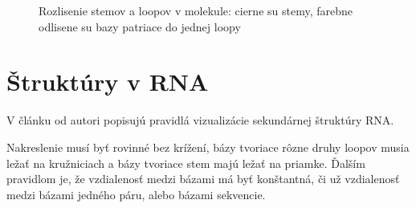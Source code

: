 \begin{figure}[H]
\centering
\caption{Rozlisenie stemov a loopov v molekule: cierne su stemy, farebne odlisene su bazy patriace do jednej loopy}
\label{obr:RNA_motifs_stem_loop}
\end{figure}

\section{Štruktúry v RNA}

V článku od \citet{RNA_DRAW} autori popisujú pravidlá vizualizácie sekundárnej štruktúry RNA.

Nakreslenie musí byť rovinné bez krížení, bázy tvoriace rôzne druhy loopov musia ležať na kružniciach
a bázy tvoriace stem majú ležať na priamke.
Ďalším pravidlom je, že vzdialenosť medzi bázami má byť konštantná, či už vzdialenosť medzi bázami jedného páru,
alebo bázami sekvencie.

